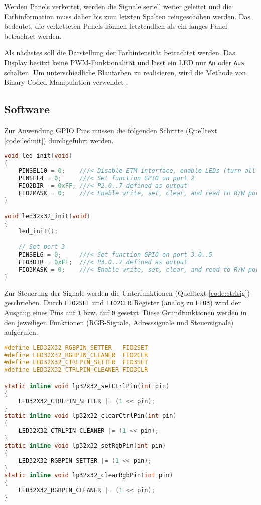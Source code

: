 Werden Panels verkettet, werden die Signale seriell weiter geleitet und die Farbinformation muss daher bis zum letzten Spalten reingeschoben werden. Das bedeutet, die verketteten Panels können letztendlich als ein langes Panel betrachtet werden.

Als nächstes soll die Darstellung der Farbintensität betrachtet werden. Das Display besitzt keine PWM-Funktionalität und lässt ein LED nur \texttt{An} oder \texttt{Aus} schalten. Um unterschiedliche Blaufarben zu realisieren, wird die Methode von Binary Coded Manipulation verwendet \cite{binCodeMan}. 

\subsection{Software}
 Zur Anwendung GPIO Pins müssen die folgenden Schritte (Quelltext \ref{code:ledinit}) durchgeführt werden.
\begin{lstlisting}[language={c}, caption={Initialisierung von GPIO als Output}, label={code:ledinit}]
void led_init(void)
{
    PINSEL10 = 0;    ///< Disable ETM interface, enable LEDs (turn all LEDs on)
    PINSEL4 = 0;     ///< Set function GPIO on port 2
    FIO2DIR  = 0xFF; ///< P2.0..7 defined as output
    FIO2MASK = 0;    ///< Enable write, set, clear, and read to R/W port 2
}

void led32x32_init(void)
{
    led_init();

    // Set port 3
    PINSEL6 = 0;     ///< Set function GPIO on port 3.0..5
    FIO3DIR = 0xFF;  ///< P3.0..7 defined as output
    FIO3MASK = 0;    ///< Enable write, set, clear, and read to R/W port 3
}
\end{lstlisting}

Zur Steuerung der Signale werden die Unterfunktionen (Quelltext \ref{code:ctrlsig}) geschrieben. Durch \texttt{FIO2SET} und \texttt{FIO2CLR} Register (analog zu \texttt{FIO3}) wird der Ausgang eines Pins auf \texttt{1} bzw. auf \texttt{0} gesetzt. Diese Grundfunktionen werden in den jeweiligen Funktionen (RGB-Signale, Adresssignale und Steuersignale) aufgerufen.

\begin{lstlisting}[language={c}, caption={Funktionen zur Steuerung der Signale.}, label={code:ctrlsig}]
#define LED32X32_RGBPIN_SETTER   FIO2SET
#define LED32X32_RGBPIN_CLEANER  FIO2CLR
#define LED32X32_CTRLPIN_SETTER  FIO3SET
#define LED32X32_CTRLPIN_CLEANER FIO3CLR

static inline void lp32x32_setCtrlPin(int pin)
{
    LED32X32_CTRLPIN_SETTER |= (1 << pin);
}
static inline void lp32x32_clearCtrlPin(int pin)
{
    LED32X32_CTRLPIN_CLEANER |= (1 << pin);
}
static inline void lp32x32_setRgbPin(int pin)
{
    LED32X32_RGBPIN_SETTER |= (1 << pin);
}
static inline void lp32x32_clearRgbPin(int pin)
{
    LED32X32_RGBPIN_CLEANER |= (1 << pin);
}
\end{lstlisting}

